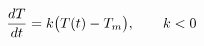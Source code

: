 \documentclass[preview]{standalone}
\begin{document}
\begin{align*}
\special{dvisvgm:raw <g id='unique000'>}\frac{dT}{dt} = k\bigl(T(t) - T_m\bigr), \qquad k < 0\special{dvisvgm:raw </g>}
\end{align*}
\end{document}
